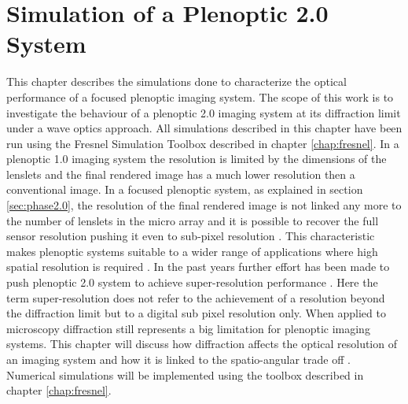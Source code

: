 \chapter{Simulation of a Plenoptic 2.0 System}
\label{chap:chapter5}
This chapter describes the simulations done to characterize the optical performance of a focused plenoptic imaging system. The scope of this work is to investigate the behaviour of a plenoptic 2.0 imaging system at its diffraction limit under a wave optics approach.  All simulations described in this chapter have been run using the Fresnel Simulation Toolbox  described in chapter \ref{chap:fresnel}. In a plenoptic 1.0 imaging system the resolution is limited by the dimensions of the lenslets \cite{georgiev2009resolution} and the final rendered image has a much lower resolution then a conventional image. In a focused plenoptic system, as explained in section \ref{sec:phase2.0}, the resolution of the final rendered image is not linked any more to the number of lenslets in the micro array and it is possible to recover the full sensor resolution pushing it even to sub-pixel resolution \cite{lumsdaine2008full,lumsdaine2009focused,georgiev2009superresolution}. This characteristic makes plenoptic systems suitable to a wider range of applications where high spatial resolution is required \cite{wetzstein2011computational}. In the past years further effort has been made to push plenoptic 2.0 system to achieve super-resolution performance \cite{georgiev2012super,georgiev2009superresolution,bishop2009light}. Here the term super-resolution does not refer to the achievement of a resolution beyond the diffraction limit\cite{georgiev2015plenoptic} but to a digital sub pixel resolution only. When applied to microscopy diffraction still represents a big limitation for plenoptic imaging systems. This chapter will discuss how diffraction affects the optical resolution of an imaging system and how it is linked to the spatio-angular trade off \cite{georgiev2006spatio}. Numerical simulations will be implemented using the toolbox described in chapter \ref{chap:fresnel}. 
\label{sec:intro4}
